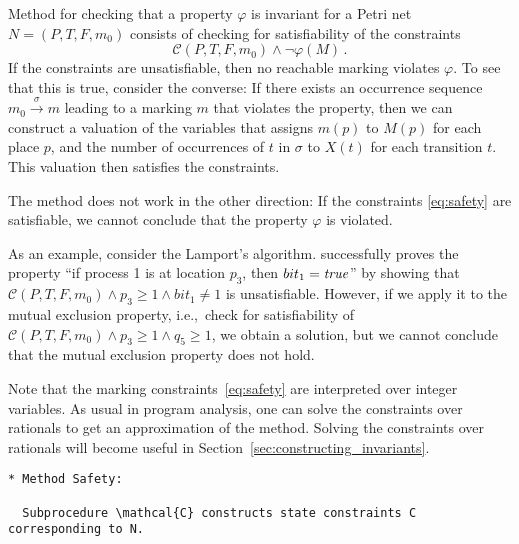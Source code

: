 Method \safety{} for checking that a property $\varphi$ is
invariant for a Petri net $N=(P,T,F,m_0)$ consists of checking for
satisfiability of the constraints
\begin{equation}\label{eq:safety}
\mathcal{C}(P,T,F,m_0) \wedge \lnot \varphi(M)\,.
\end{equation}
If the constraints are unsatisfiable, then no reachable marking
violates $\varphi$. To see that this is true, consider the converse:
If there exists an occurrence sequence $m_0
\xrightarrow{\sigma} m$ leading to a marking $m$ that violates the
property, then we can construct a valuation of the variables that assigns $m(p)$ to
$M(p)$ for each place $p$, and the number of occurrences of $t$ in
$\sigma$ to $X(t)$ for each transition $t$. This valuation then
satisfies the constraints.

The method does not work in the other direction: If the constraints
\eqref{eq:safety} are satisfiable, we cannot conclude that the
property $\varphi$ is violated.

As an example, consider the Lamport's algorithm. \safety{}
successfully proves the property ``if process
1 is at location $p_3$, then ${bit_1}={\operatorname{\mathit{true}}}$'' by showing
that $\mathcal{C}(P,T,F,m_0) \wedge p_3 \geq 1 \wedge bit_1
\neq 1$ is unsatisfiable. However, if we apply it to the mutual
exclusion property, i.e.,~check for satisfiability of
$\mathcal{C}(P,T,F,m_0) \wedge p_3 \geq 1\wedge q_5 \geq 1$, we obtain
a solution, but we cannot conclude that the mutual exclusion property
does not hold.

Note that the marking constraints~\eqref{eq:safety} are interpreted over integer
variables.
As usual in program analysis, one can solve the constraints over rationals to get an approximation
of the method. Solving the constraints over rationals will become
useful in Section~\ref{sec:constructing_invariants}.


\begin{verbatim}
* Method Safety:

  Subprocedure \mathcal{C} constructs state constraints C corresponding to N.
\end{verbatim}




